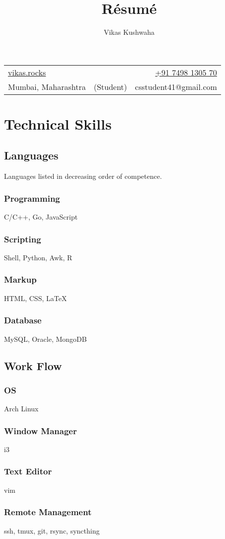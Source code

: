 \documentclass[letterpaper,12pt]{extarticle}
\title{R\'esum\'e}
\author{Vikas Kushwaha}
\begin{document}
\noindent
\begin{tabular*}{\textwidth}{@{\extracolsep{\fill}}lcr}
	\href{https://vikas.rocks}{\underline{vikas.rocks}} &
	\href{https://vikas.rocks}{\Large\bfseries \theauthor} &
	\href{tel:+917498130470}{+91 7498 1305 70} \\
	Mumbai, Maharashtra &
	(Student) \thetitle &
	csstudent41@gmail.com
\end{tabular*}

\section{Technical Skills}

\begin{minipage}[t]{0.5\textwidth}
	\subsection{Languages} Languages listed in decreasing order of competence.
	\subsubsection{Programming} C/C++, Go, JavaScript
	\subsubsection{Scripting} Shell, Python, Awk, R
	\subsubsection{Markup} HTML, CSS, {\LaTeX}
	\subsubsection{Database}
	MySQL, Oracle, MongoDB
\end{minipage}
\hfill
\vrule
\hfill
\begin{minipage}[t]{0.45\textwidth}
	\subsection{Work Flow}
	\subsubsection{OS} Arch Linux
	\subsubsection{Window Manager} i3
	\subsubsection{Text Editor} vim
	\subsubsection{Remote Management} ssh, tmux, git, rsync, syncthing
\end{minipage}
\end{document}
